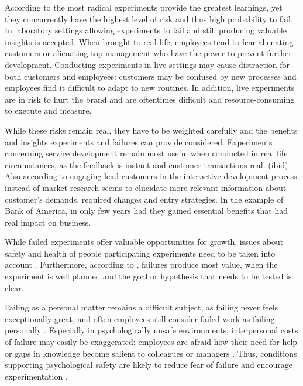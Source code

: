 According to \citet{thomke2003r} the most radical experiments provide the greatest learnings, yet they concurrently have the highest level of risk and thus high probability to fail. In laboratory settings allowing experiments to fail and still producing valuable insights is accepted. When brought to real life, employees tend to fear alienating customers or alienating top management who have the power to prevent further development. Conducting experiments in live settings may cause distraction for both customers and employees: customers may be confused by new processes and employees find it difficult to adapt to new routines. In addition, live experiments are in risk to hurt the brand and are oftentimes difficult and resource-consuming to execute and measure.\citep{thomke2003r}

While these risks remain real, they have to be weighted carefully and the benefits and insights experiments and failures can provide considered. Experiments concerning service development remain most useful when conducted in real life circumstances, as the feedback is instant and customer transactions real. (ibid) Also according to \citet{quinn1985managing} engaging lead customers in the interactive development process instead of market research seems to elucidate more relevant information about customer's demands, required changes and entry strategies. In the example of Bank of America, in only few years had they gained essential benefits that had real impact on business. \citep{thomke2003r}

While failed experiments offer valuable opportunities for growth, issues about safety and health of people participating experiments need to be taken into account \citep{farson2002failuretolerantleader}. Furthermore, according to \citet{thomke2001enlightened}, failures produce most value, when the experiment is well planned and the goal or hypothesis that needs to be tested is clear. 

Failing as a personal matter remains a difficult subject, as failing never feels exceptionally great, and often employees still consider failed work as failing personally \citep{farson2002failuretolerantleader}. Especially in psychologically unsafe environments, interpersonal costs of failure may easily be exaggerated: employees are afraid how their need for help or gaps in knowledge become salient to colleagues or managers \citep{lee1997going}. Thus, conditions supporting psychological safety are likely to reduce fear of failure and encourage experimentation \citep{lee2004mixed}.

